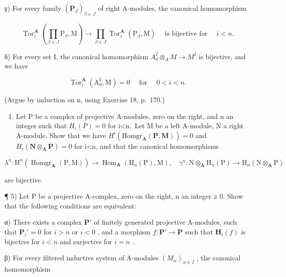 γ) For every family \((\mathbf{P}_{\beta})_{\beta \in J}\) of right A-modules, the canonical homomorphism

\[
\operatorname{Tor} _ {i} ^ {\mathbf {A}} \left(\prod_ {\beta \in J} \mathrm{P} _ {\beta}, \mathrm{M}\right)\rightarrow \prod_ {\beta \in J} \operatorname{Tor} _ {i} ^ {\mathbf {A}} \left(\mathrm{P} _ {\beta}, \mathrm{M}\right) \quad \text { is   bijective   for } \quad i <   n.
\]

δ) For every set I, the canonical homomorphism \(A_{d}^{I} \otimes_{A} M \to M^{I}\) is bijective, and we have

\[
\operatorname{Tor} _ {i} ^ {\mathbf {A}} \left(\mathrm{A} _ {d} ^ {\mathrm{I}}, \mathrm{M}\right) = 0 \quad \text { for } \quad 0 <   i <   n.
\]

(Argue by induction on n, using Exercise 18, p.~170.)

\begin{enumerate}
\def\labelenumi{\arabic{enumi})}
\setcounter{enumi}{3}
\tightlist
\item
  Let P be a complex of projective A-modules, zero on the right, and n an integer such that \(H_{i}(P)=0\) for i\textless n.~Let M be a left A-module, N a right A-module. Show that we have \(H^{i}(\mathrm{Homgr}_{\mathbf{A}}(\mathbf{P},\mathbf{M}))=0\) and \(H_{i}(\mathbf{N}\otimes_{\mathbf{A}}\mathbf{P})=0\) for i\textless n, and that the canonical homomorphisms
\end{enumerate}

\[
\lambda^ {n}: \mathrm{H} ^ {n} (\operatorname{Homgr} _ {\mathbf {A}} (\mathrm{P}, \mathrm{M})) \rightarrow \operatorname{Hom} _ {\mathbf {A}} \left(\mathrm{H} _ {n} (\mathrm{P}), \mathrm{M}\right), \quad \gamma^ {n}: \mathrm{N} \otimes_ {\mathbf {A}} \mathrm{H} _ {n} (\mathrm{P}) \rightarrow \mathrm{H} _ {n} (\mathrm{N} \otimes_ {\mathbf {A}} \mathrm{P})
\]

are bijective.

¶ 5) Let P be a projective A-complex, zero on the right, n an integer ≥ 0. Show that the following conditions are equivalent:

α) There exists a complex \(\mathbf{P}'\) of finitely generated projective A-modules, such that \(\mathbf{P}_i' = 0\) for \(i > n\) or \(i < 0\) , and a morphism \(f: \mathbf{P}' \to \mathbf{P}\) such that \(\mathbf{H}_i(f)\) is bijective for \(i < n\) and surjective for \(i = n\) .

β) For every filtered inductive system of A-modules \((M_{\alpha})_{\alpha \in I}\) , the canonical homomorphism

